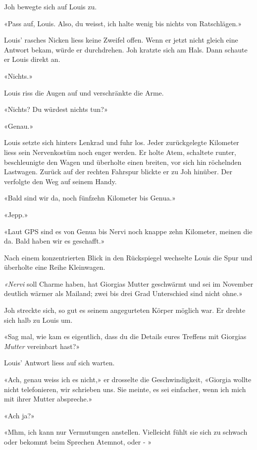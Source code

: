 \sectionbreak

Joh bewegte sich auf Louis zu.

«Pass auf, Louis. Also, du weisst, ich halte wenig bis nichts von
Ratschlägen.»

Louis’ rasches Nicken liess keine Zweifel offen. Wenn er jetzt nicht
gleich eine Antwort bekam, würde er durchdrehen.
Joh kratzte sich am Hals. Dann schaute er Louis direkt an.

«Nichts.»

Louis riss die Augen auf und verschränkte die Arme.

«Nichts? Du würdest nichts tun?»

«Genau.»

\sectionbreak

Louis setzte sich hinters Lenkrad und fuhr los. Jeder zurückgelegte Kilometer liess sein 
Nervenkostüm noch enger werden. Er holte Atem, schaltete runter, beschleunigte den Wagen und
überholte einen breiten, vor sich hin röchelnden Lastwagen. Zurück auf
der rechten Fahrspur blickte er zu Joh hinüber. Der verfolgte den Weg auf seinem Handy.

«Bald sind wir da, noch fünfzehn Kilometer bis Genua.»

«Jepp.»

«Laut GPS sind es von Genua bis Nervi noch knappe zehn Kilometer,
meinen die da. Bald haben wir es geschafft.»

Nach einem konzentrierten Blick in den Rückspiegel wechselte Louis die
Spur und überholte eine Reihe Kleinwagen.

\emph{«Nervi} soll Charme haben, hat Giorgias Mutter geschwärmt und sei im November 
deutlich wärmer als Mailand; zwei bis drei Grad Unterschied sind nicht ohne.»

Joh streckte sich, so gut es seinem angegurteten Körper möglich war. Er drehte sich halb zu Louis um.

«Sag mal, wie kam es eigentlich, dass du die Details eures Treffens mit
Giorgias \emph{Mutter} vereinbart hast?»

Louis’ Antwort liess auf sich warten.

«Ach, genau weiss ich es nicht,» er drosselte die Geschwindigkeit,
«Giorgia wollte nicht telefonieren, wir schrieben uns. Sie meinte, es
sei einfacher, wenn ich mich mit ihrer Mutter abspreche.»

«Ach ja?»

«Mhm, ich kann nur Vermutungen anstellen. Vielleicht fühlt sie sich zu
schwach oder bekommt beim Sprechen Atemnot, oder - »

